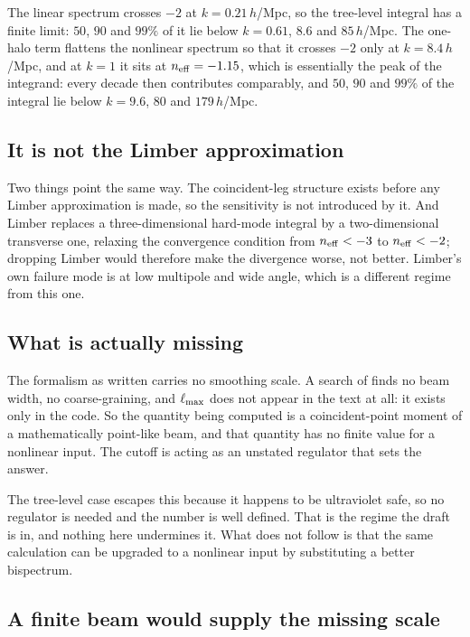 The linear spectrum crosses $-2$ at $k=0.21\,h$/Mpc, so the tree-level
integral has a finite limit: $50$, $90$ and $99\%$ of it lie below $k=0.61$,
$8.6$ and $85\,h$/Mpc. The one-halo term flattens the nonlinear spectrum so
that it crosses $-2$ only at $k=8.4\,h$/Mpc, and at $k=1$ it sits at
$n_{\rm eff}=-1.15$, which is essentially the peak of the integrand: every
decade then contributes comparably, and $50$, $90$ and $99\%$ of the
integral lie below $k=9.6$, $80$ and $179\,h$/Mpc.

\subsection{It is not the Limber approximation}

Two things point the same way. The coincident-leg structure exists before
any Limber approximation is made, so the sensitivity is not introduced by
it. And Limber replaces a three-dimensional hard-mode integral by a
two-dimensional transverse one, relaxing the convergence condition from
$n_{\rm eff}<-3$ to $n_{\rm eff}<-2$; dropping Limber would therefore make
the divergence worse, not better. Limber's own failure mode is at low
multipole and wide angle, which is a different regime from this one.

\subsection{What is actually missing}

The formalism as written carries no smoothing scale. A search of
 finds no beam width, no coarse-graining, and $\ell_{\max}$ does
not appear in the text at all: it exists only in the code. So the quantity
being computed is a coincident-point moment of a mathematically point-like
beam, and that quantity has no finite value for a nonlinear input. The
cutoff is acting as an unstated regulator that sets the answer.

The tree-level case escapes this because it happens to be ultraviolet safe,
so no regulator is needed and the number is well defined. That is the
regime the draft is in, and nothing here undermines it. What does not
follow is that the same calculation can be upgraded to a nonlinear input by
substituting a better bispectrum.

\subsection{A finite beam would supply the missing scale}

